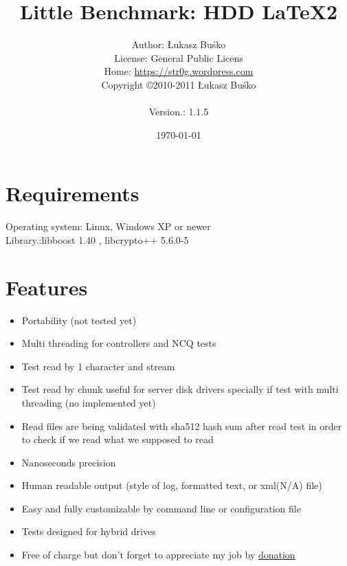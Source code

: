 \documentclass[a4paper]{article}
\begin{document}
\title{Little Benchmark: HDD  \LaTeX2}
\author{Author: Łukasz Buśko
\\License: General Public Licens
\\Home:  \href{https://str0g.wordpress.com}{https://str0g.wordpress.com}
\\Copyright \copyright 2010-2011 Łukasz Buśko\\
\date{\today} Version.: 1.1.5}
\maketitle
\newpage
\tableofcontents
\newpage

\section{Requirements}
Operating system: Linux, Windows XP or newer\\
Library.:libboost 1.40 , libcrypto++ 5.6.0-5
\section{Features}
\begin{itemize}
\item Portability (not tested yet)
\item Multi threading for controllers and NCQ tests
\item Test read by 1 character and stream
\item Test read by chunk useful for server disk drivers specially if test with multi threading (no implemented yet)
\item Read files are being validated with sha512 hash sum after read test in order to check if we read what we supposed to read
\item Nanoseconds precision
\item Human readable output (style of log, formatted text, or xml(N/A) file)
\item Easy and fully customizable by command line or configuration file
\item Tests designed for hybrid drives
\item Free of charge but don't forget to appreciate my job by \href{http://str0g.wordpress.com/about/}{\underline{donation}}
\end{itemize}

\newpage

\newpage


\newpage


\newpage

\end{document}
